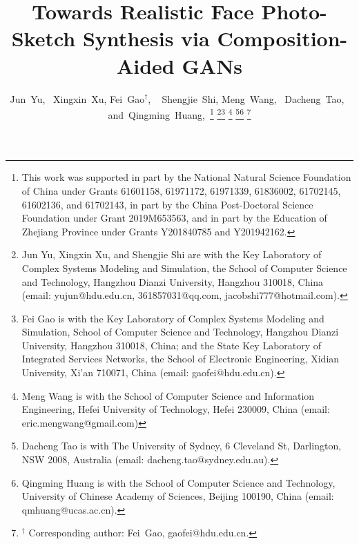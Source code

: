 \documentclass[journal]{IEEEtran}
\begin{document}
\title{Towards Realistic Face Photo-Sketch Synthesis via Composition-Aided GANs}


\author{Jun~Yu,~
		Xingxin~Xu, 
        Fei~Gao$^{\dag}$, ~
        Shengjie~Shi, 
        Meng~Wang,~
        Dacheng~Tao,~
        and~Qingming~Huang,~\thanks{This work was supported in part by the National Natural Science Foundation of China under Grants 61601158, 61971172, 61971339, 61836002, 61702145, 61602136, and 61702143, in part by the China Post-Doctoral Science Foundation under Grant 2019M653563, and in part by the Education of Zhejiang Province under Grants Y201840785 and Y201942162.}
\thanks{Jun Yu, Xingxin Xu, and Shengjie Shi are with the Key Laboratory of Complex Systems Modeling and Simulation, the School of Computer Science and Technology, Hangzhou Dianzi University, 
Hangzhou 310018, China (email: yujun@hdu.edu.cn, 361857031@qq.com, jacobshi777@hotmail.com).}\thanks{Fei Gao is with the Key Laboratory of Complex Systems Modeling and Simulation, School of Computer Science and Technology, Hangzhou Dianzi University, Hangzhou 310018, China; and the State Key Laboratory of Integrated Services Networks, the School of Electronic Engineering, Xidian University, Xi'an 710071, China (email: gaofei@hdu.edu.cn).}
\thanks{Meng Wang is with the School of Computer Science and Information Engineering, Hefei University of Technology, Hefei 230009, China (email: eric.mengwang@gmail.com)}
\thanks{Dacheng Tao is with The University of Sydney, 6 Cleveland St, Darlington, NSW 2008, Australia (email: dacheng.tao@sydney.edu.au).}\thanks{Qingming Huang is with the School of Computer Science and Technology, University of Chinese Academy of Sciences, Beijing 100190, China (email: qmhuang@ucas.ac.cn).}
\thanks{$^\dag$ Corresponding author: Fei~Gao, gaofei@hdu.edu.cn.}}




















\maketitle
\end{document}
